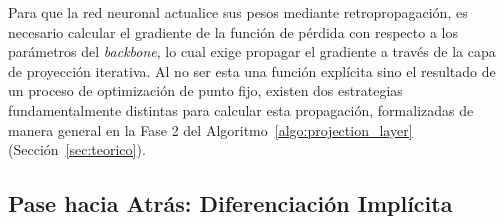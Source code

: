 Para que la red neuronal actualice sus pesos mediante retropropagación, es necesario calcular 
el gradiente de la función de pérdida con respecto a los parámetros del \textit{backbone}, lo 
cual exige propagar el gradiente a través de la capa de proyección iterativa. Al no ser esta 
una función explícita sino el resultado de un proceso de optimización de punto fijo, existen 
dos estrategias fundamentalmente distintas para calcular esta propagación, formalizadas de 
manera general en la Fase 2 del Algoritmo~\ref{algo:projection_layer} (Sección~\ref{sec:teorico}).








\subsection{Pase hacia Atrás: Diferenciación Implícita}
\label{subsec:backward_pass}

